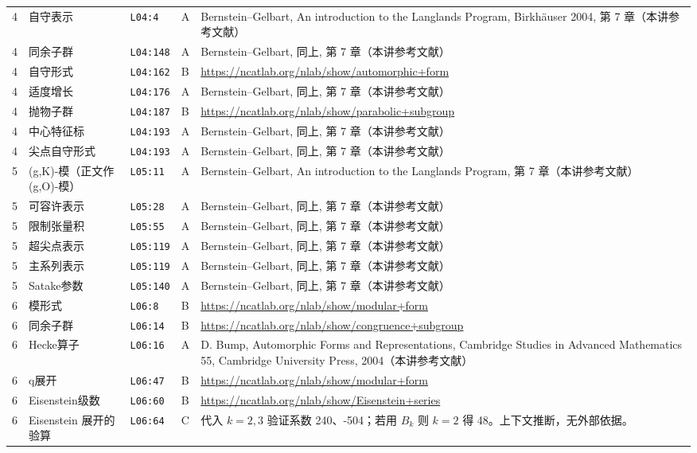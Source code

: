 \begin{longtable}{@{}p{1.0cm}p{3.3cm}p{1.5cm}p{1.3cm}p{7.9cm}@{}}
\midrule
4 & 自守表示 & \texttt{L04:4} & A & Bernstein–Gelbart, An introduction to the Langlands Program, Birkhäuser 2004, 第 7 章（本讲参考文献） \\
4 & 同余子群 & \texttt{L04:148} & A & Bernstein–Gelbart, 同上, 第 7 章（本讲参考文献） \\
4 & 自守形式 & \texttt{L04:162} & B & \url{https://ncatlab.org/nlab/show/automorphic+form} \\
4 & 适度增长 & \texttt{L04:176} & A & Bernstein–Gelbart, 同上, 第 7 章（本讲参考文献） \\
4 & 抛物子群 & \texttt{L04:187} & B & \url{https://ncatlab.org/nlab/show/parabolic+subgroup} \\
4 & 中心特征标 & \texttt{L04:193} & A & Bernstein–Gelbart, 同上, 第 7 章（本讲参考文献） \\
4 & 尖点自守形式 & \texttt{L04:193} & A & Bernstein–Gelbart, 同上, 第 7 章（本讲参考文献） \\
\midrule
5 & (g,K)-模（正文作 (g,O)-模） & \texttt{L05:11} & A & Bernstein–Gelbart, An introduction to the Langlands Program, 第 7 章（本讲参考文献） \\
5 & 可容许表示 & \texttt{L05:28} & A & Bernstein–Gelbart, 同上, 第 7 章（本讲参考文献） \\
5 & 限制张量积 & \texttt{L05:55} & A & Bernstein–Gelbart, 同上, 第 7 章（本讲参考文献） \\
5 & 超尖点表示 & \texttt{L05:119} & A & Bernstein–Gelbart, 同上, 第 7 章（本讲参考文献） \\
5 & 主系列表示 & \texttt{L05:119} & A & Bernstein–Gelbart, 同上, 第 7 章（本讲参考文献） \\
5 & Satake参数 & \texttt{L05:140} & A & Bernstein–Gelbart, 同上, 第 7 章（本讲参考文献） \\
\midrule
6 & 模形式 & \texttt{L06:8} & B & \url{https://ncatlab.org/nlab/show/modular+form} \\
6 & 同余子群 & \texttt{L06:14} & B & \url{https://ncatlab.org/nlab/show/congruence+subgroup} \\
6 & Hecke算子 & \texttt{L06:16} & A & D. Bump, Automorphic Forms and Representations, Cambridge Studies in Advanced Mathematics 55, Cambridge University Press, 2004（本讲参考文献） \\
6 & q展开 & \texttt{L06:47} & B & \url{https://ncatlab.org/nlab/show/modular+form} \\
6 & Eisenstein级数 & \texttt{L06:60} & B & \url{https://ncatlab.org/nlab/show/Eisenstein+series} \\
6 & Eisenstein 展开的验算 & \texttt{L06:64} & C & 代入 $k=2,3$ 验证系数 240、-504；若用 $B_k$ 则 $k=2$ 得 48。上下文推断，无外部依据。 \\

\end{longtable}
